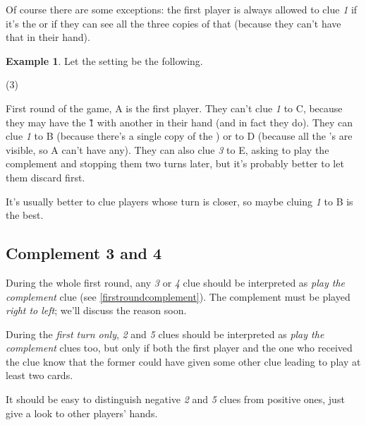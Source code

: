 \documentclass[a4paper]{article}
\theoremstyle{plain}
\theoremstyle{definition}
\newtheorem{example}[theorem]{Example}
\begin{document}
Of course there are some exceptions: the first player is always allowed to clue \textit{1} if it's the  or if they can see all the three copies of that  (because they can't have that  in their hand).

\begin{example}
	
	Let the setting be the following.
	
	\begin{tasks}(3)
		\task[+]      
		\task[A]    
		\task[B]    
		\task[C]    
		\task[D]    
		\task[E]    
	\end{tasks}
	
	First round of the game, A is the first player. They can't clue \textit{1} to C, because they may have the \G{1} with another  in their hand (and in fact they do). They can clue \textit{1} to B (because there's a single copy of the ) or to D (because all the 's are visible, so A can't have any). They can also clue \textit{3} to E, asking to play the complement and stopping them two turns later, but it's probably better to let them discard first.
	
	It's usually better to clue players whose turn is closer, so maybe cluing \textit{1} to B is the best.
\end{example}

\subsection{Complement 3 and 4}

During the whole first round, any \textit{3} or \textit{4} clue should be interpreted as \textit{play the complement} clue (see \ref{firstroundcomplement}). The complement must be played \textit{right to left}; we'll discuss the reason soon.

During the \textit{first turn only}, \textit{2} and \textit{5} clues should be interpreted as \textit{play the complement} clues too, but only if both the first player and the one who received the clue know that the former could have given some other clue leading to play at least two cards.

It should be easy to distinguish negative \textit{2} and \textit{5} clues from positive ones, just give a look to other players' hands.
\end{document}
